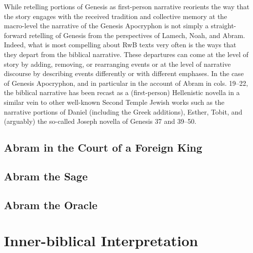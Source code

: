 While retelling portions of Genesis as first-person narrative reorients
the way that the story engages with the received tradition and
collective memory at the macro-level the narrative of the
Genesis Apocryphon is not simply a straight-forward retelling of Genesis
from the perspectives of Lamech, Noah, and Abram. Indeed, what is most
compelling about RwB texts very often is the ways that they depart from
the biblical narrative. These departures can come at the level of story
by adding, removing, or rearranging events or at the level of narrative
discourse by describing events differently or with different emphases.
In the case of Genesis Apocryphon, and in particular in the account of
Abram in cols. 19--22, the biblical narrative has been recast as a
(first-person) Hellenistic novella in a similar vein to other well-known
Second Temple Jewish works such as the narrative portions of Daniel
(including the Greek additions), Esther, Tobit, and (arguably) the
so-called Joseph novella of Genesis 37 and 39--50.\autocite[The reading
of Genesis Apocryphon 19--20 as a Hellenistic Jewish novella has
recently been very thoroughly argued in][]{jurgens_jsj2018}

\hypertarget{abram-in-the-court-of-a-foreign-king}{%
\subsection{Abram in the Court of a Foreign
King}\label{abram-in-the-court-of-a-foreign-king}}

\hypertarget{abram-the-sage}{%
\subsection{Abram the Sage}\label{abram-the-sage}}

\hypertarget{abram-the-oracle}{%
\subsection{Abram the Oracle}\label{abram-the-oracle}}

\hypertarget{inner-biblical-interpretation}{%
\section{Inner-biblical
Interpretation}\label{inner-biblical-interpretation}}

